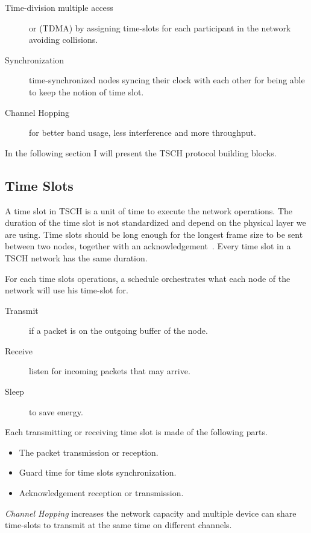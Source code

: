 \begin{description}
  \item[Time-division multiple access] or (TDMA) by assigning time-slots for each
    participant in the network avoiding collisions.
  \item[Synchronization] time-synchronized nodes syncing their clock with each
    other for being able to keep the notion of time slot.
  \item[Channel Hopping] for better band usage, less interference and more
    throughput.
\end{description}

In the following section I will present the TSCH protocol building blocks.

\subsection{Time Slots}

A time slot in TSCH is a unit of time to execute the network operations. 
The duration of the time slot is not standardized and depend on the physical 
layer we are using. 
Time slots should be long enough for the longest frame size to be sent
between two nodes, together with an acknowledgement~\cite{rfc7554}. 
Every time slot in a TSCH network has the same duration.

For each time slots operations, a schedule orchestrates what each
node of the network will use his time-slot for.

\begin{description}
  \item [Transmit] if a packet is on the outgoing buffer of the node.
  \item [Receive] listen for incoming packets that may arrive.
  \item [Sleep] to save energy.
\end{description}

Each transmitting or receiving time slot is made of the following parts.

\begin{itemize}
  \item The packet transmission or reception.
  \item Guard time for time slots synchronization.
  \item Acknowledgement reception or transmission.
\end{itemize}

\emph{Channel Hopping} increases the network capacity and multiple device can
share time-slots to transmit at the same time on different channels.

